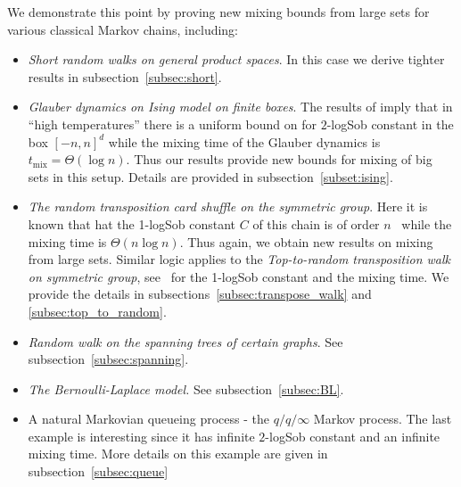 \documentclass[11pt]{amsart}
\newcommand{\tm}{t_{\mathrm{mix}}}
\newcommand{\1}{\mathbf{1}}
\theoremstyle{definition}
\theoremstyle{plain}
\theoremstyle{remark}
\numberwithin{equation}{section}
\begin{document}
We demonstrate this point by proving new mixing bounds from large sets for various classical Markov chains, including:
\begin{itemize}
\item
{\em Short random walks on general product spaces}. 
In this case we derive tighter results in subsection~\ref{subsec:short}. 
\item
{\em Glauber dynamics on Ising model on finite boxes}. The results of \cite{Stroock92a, Stroock92b, Zegar92, Martinelli94a, Martinelli94b} imply that in ``high temperatures'' there is a uniform bound on  for $2$-logSob constant in the box $[-n,n]^d$ while the mixing time of the Glauber dynamics is $\tm = \Theta(\log n)$. 
Thus our results provide new bounds for mixing of big sets in this setup.  Details are provided in subsection~\ref{subset:ising}.
\item
{\em The random transposition card shuffle on the symmetric group}. Here
it is known that hat the 1-logSob constant $C$ of this chain is of order $n$~\cite{Quastel03, BT03, Goel04} while the mixing time is $\Theta(n \log n)$. Thus again, we obtain new results on mixing from large sets. 
Similar logic applies to the {\em Top-to-random transposition walk on symmetric group}, see~\cite{Goel04, Diaconis92} for the 1-logSob constant and the mixing time.  We provide the details in subsections~\ref{subsec:transpose_walk} and \ref{subsec:top_to_random}.
\item  {\em Random walk on the spanning trees of certain graphs}. See subsection~\ref{subsec:spanning}.
\item {\em The Bernoulli-Laplace model.} See subsection~\ref{subsec:BL}.

\item
A natural Markovian queueing process - the $q/q/\infty$ Markov process. The last example is interesting since it has infinite $2$-logSob constant
and an infinite mixing time. More details on this example are given in subsection~\ref{subsec:queue}
\end{itemize}
\end{document}
